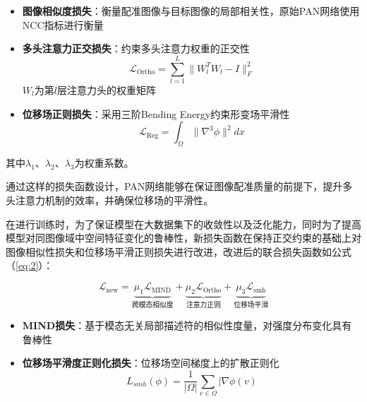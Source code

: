 \begin{itemize}
    \item \textbf{图像相似度损失}：衡量配准图像与目标图像的局部相关性，原始PAN网络使用NCC指标进行衡量

    \item \textbf{多头注意力正交损失}：约束多头注意力权重的正交性
          \begin{equation}
              \mathcal{L}_{\text{Ortho}} = \sum_{l=1}^L \|W_l^T W_l - I\|_F^2
          \end{equation}
          $W_l$为第$l$层注意力头的权重矩阵

    \item \textbf{位移场正则损失}：采用三阶Bending Energy约束形变场平滑性
          \begin{equation}
              \mathcal{L}_{\text{Reg}} = \int_\Omega \|\nabla^3 \phi\|^2 dx
          \end{equation}
\end{itemize}

其中$\lambda_1$、$\lambda_2$、$\lambda_3$为权重系数。

通过这样的损失函数设计，PAN网络能够在保证图像配准质量的前提下，提升多头注意力机制的效率，并确保位移场的平滑性。


在进行训练时，为了保证模型在大数据集下的收敛性以及泛化能力，同时为了提高模型对同图像域中空间特征变化的鲁棒性，新损失函数在保持正交约束的基础上对图像相似性损失和位移场平滑正则损失进行改进，改进后的联合损失函数如公式（\ref{eq:2}）：

\begin{equation}
    \mathcal{L}_{\text{new}} = \underbrace{\mu_1 \mathcal{L}_{\text{MIND}}}_{\text{跨模态相似度}} + \underbrace{\mu_2 \mathcal{L}_{\text{Ortho}}}_{\text{注意力正则}} + \underbrace{\mu_3 \mathcal{L}_{\text{smh}}}_{\text{位移场平滑}}
    \label{eq:2}
\end{equation}

\begin{itemize}
    \item \textbf{MIND损失}：基于模态无关局部描述符的相似性度量，对强度分布变化具有鲁棒性

    \item \textbf{位移场平滑度正则化损失}：位移场空间梯度上的扩散正则化
          \begin{equation}
              L_{smh}(\phi)=\frac{1}{|\Omega|}\sum_{v\in\Omega}|\nabla \phi(v)
          \end{equation}

\end{itemize}

